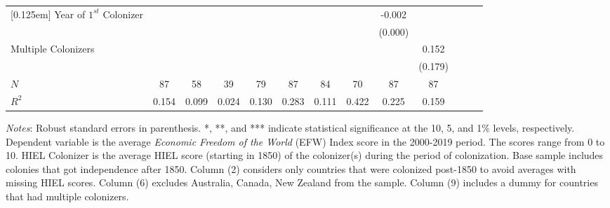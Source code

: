 \begin{sidewaystable}[h!]
\begin{threeparttable}
\begin{center}
\begin{minipage}{\textwidth}
\begin{tabular*}{\textwidth}{@{\extracolsep{\fill}}lcccccccccccc@{\extracolsep{\fill}}}
[0.125em]
Year of $1^{st}$ Colonizer      &                     &                     &                     &                     &                     &                     &                     &    -0.002\sym{***}&                     \\
            &                     &                     &                     &                     &                     &                     &                     &  (0.000)         &                     \\
[0.125em]
Multiple Colonizers    &                     &                     &                     &                     &                     &                     &                     &                     &       0.152         \\
            &                     &                     &                     &                     &                     &                     &                     &                     &     (0.179)         \\ \hline
\(N\)       &          87         &          58         &          39         &          79         &          87         &          84         &          70         &          87         &          87         \\
\(R^{2}\)   &       0.154         &       0.099         &       0.024         &       0.130         &       0.283         &       0.111         &       0.422         &       0.225         &       0.159         \\ \hline\hline
\end{tabular*}
\begin{tablenotes}
\small
\item \textit{Notes}: Robust standard errors in parenthesis. *, **, and *** indicate statistical significance at the 10, 5, and 1\% levels, respectively. Dependent variable is the average \textit{Economic Freedom of the World} (EFW) Index score in the 2000-2019 period. The scores range from 0 to 10. HIEL Colonizer is the average HIEL score (starting in 1850) of the colonizer(s) during the period of colonization. Base sample includes colonies that got independence after 1850. Column (2) considers only countries that were colonized post-1850 to avoid averages with missing HIEL scores. Column (6) excludes Australia, Canada, New Zealand from the sample. Column (9) includes a dummy for countries that had multiple colonizers.
\end{tablenotes}
\end{minipage}
\end{center}
\end{threeparttable}
\end{sidewaystable}

